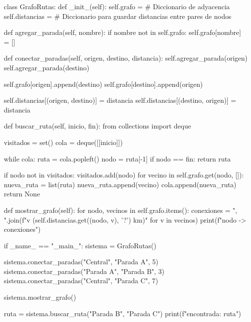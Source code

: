 class GrafoRutas:
    def _init_(self):
        self.grafo = {}  # Diccionario de adyacencia
        self.distancias = {}  # Diccionario para guardar distancias entre pares de nodos

    def agregar_parada(self, nombre):
        if nombre not in self.grafo:
            self.grafo[nombre] = []

    def conectar_paradas(self, origen, destino, distancia):
        self.agregar_parada(origen)
        self.agregar_parada(destino)

        self.grafo[origen].append(destino)
        self.grafo[destino].append(origen)

        self.distancias[(origen, destino)] = distancia
        self.distancias[(destino, origen)] = distancia  

    def buscar_ruta(self, inicio, fin):
        from collections import deque

        visitados = set()
        cola = deque([[inicio]])

        while cola:
            ruta = cola.popleft()
            nodo = ruta[-1]
            if nodo == fin:
                return ruta

            if nodo not in visitados:
                visitados.add(nodo)
                for vecino in self.grafo.get(nodo, []):
                    nueva_ruta = list(ruta)
                    nueva_ruta.append(vecino)
                    cola.append(nueva_ruta)
        return None

    def mostrar_grafo(self):
        for nodo, vecinos in self.grafo.items():
            conexiones = ", ".join(f"{v} ({self.distancias.get((nodo, v), '?')} km)" for v in vecinos)
            print(f"{nodo} -> {conexiones}")

if _name_ == "_main_":
    sistema = GrafoRutas()

    sistema.conectar_paradas("Central", "Parada A", 5)
    sistema.conectar_paradas("Parada A", "Parada B", 3)
    sistema.conectar_paradas("Central", "Parada C", 7)

    sistema.mostrar_grafo()

    ruta = sistema.buscar_ruta("Parada B", "Parada C")
    print(f"\nRuta encontrada: {ruta}")